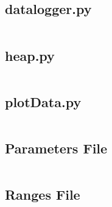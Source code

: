 \begin{flushleft}
        \label{sec:datalogger.py}
        \subsection{datalogger.py}
        \inputminted[frame=leftline,framesep=2mm,baselinestretch=1.2,fontsize=\small,linenos,breaklines]{python}{../Scripts/datalogger.py}

        \label{sec:heap.py}
        \subsection{heap.py}
        \inputminted[frame=leftline,framesep=2mm,baselinestretch=1.2,fontsize=\small,linenos,breaklines]{python}{../Scripts/heap.py}

        \label{sec:plotData.py}
        \subsection{plotData.py}
        \inputminted[frame=leftline,framesep=2mm,baselinestretch=1.2,fontsize=\small,linenos,breaklines]{python}{../Scripts/plotData.py}

        \label{sec:paramfile}
        \subsection{Parameters File}
        \inputminted[frame=leftline,framesep=2mm,baselinestretch=1.2,fontsize=\small,linenos]{json}{../Parameters/Default.param}

        \label{sec:rangefile}
        \subsection{Ranges File}
        \inputminted[frame=leftline,framesep=2mm,baselinestretch=1.2,fontsize=\small,linenos]{json}{../Parameters/Range.param}

\end{flushleft}